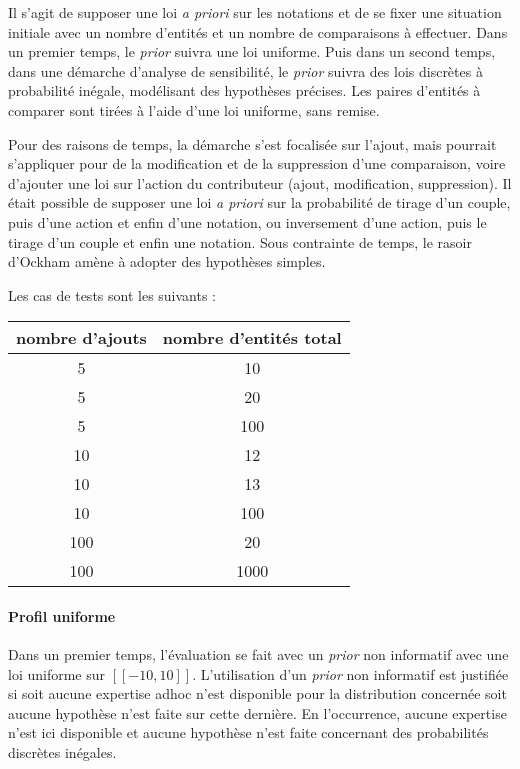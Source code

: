 Il s'agit de supposer une loi \textit{a priori} sur les notations et de se fixer une situation initiale avec un nombre d'entités et un nombre de comparaisons à effectuer. Dans un premier temps, le \textit{prior} suivra une loi uniforme. Puis dans un second temps, dans une démarche d'analyse de sensibilité, le \textit{prior} suivra des lois discrètes à probabilité inégale, modélisant des hypothèses précises. Les paires d'entités à comparer sont tirées à l'aide d'une loi uniforme, sans remise.

Pour des raisons de temps, la démarche s'est focalisée sur l'ajout, mais pourrait s'appliquer pour de la modification et de la suppression d'une comparaison, voire d'ajouter une loi sur l'action du contributeur (ajout, modification, suppression). Il était possible de supposer une loi \textit{a priori} sur
la probabilité de tirage d'un couple, puis d'une action et enfin d'une notation, ou inversement d'une action, puis le tirage d'un couple et enfin une notation. Sous contrainte de temps, le rasoir d'Ockham amène à adopter des hypothèses simples.

Les cas de tests sont les suivants :

\begin{center}
\begin{tabular}{ |c|c| } 

\hline
nombre d'ajouts & nombre d'entités total  \\
\hline
5 &  10   \\
5 &  20   \\
5 &  100   \\
10 &  12   \\
10 &  13   \\
10 &  100   \\
100 &  20   \\
100 &  1000   \\
\hline
\end{tabular}
\end{center}

\paragraph{Profil uniforme}

Dans un premier temps, l'évaluation se fait avec un \textit{prior} non informatif avec une loi uniforme sur $[\![-10,10]\!]$. L'utilisation d'un \textit{prior} non informatif est justifiée si soit aucune expertise adhoc n'est disponible pour la distribution concernée soit aucune hypothèse n'est faite sur cette dernière. En l'occurrence, aucune expertise n'est ici disponible et aucune hypothèse n'est faite concernant des probabilités discrètes inégales.

